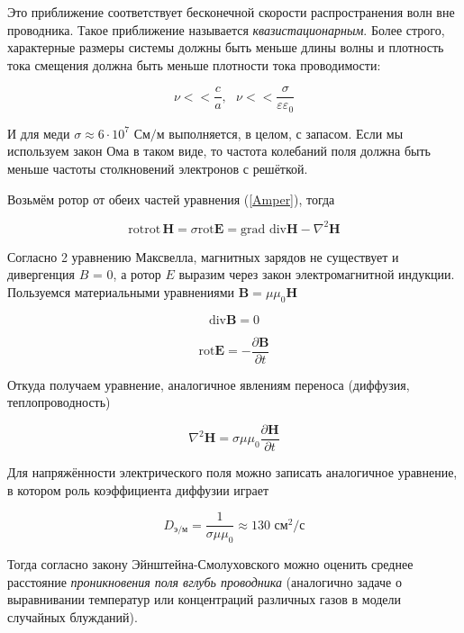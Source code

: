 \documentclass[a4paper, 12pt]{article} %
\begin{document}
Это приближение соответствует бесконечной скорости распространения волн вне проводника. Такое приближение называется \textit{квазистационарным}. Более строго, характерные размеры системы должны быть меньше длины волны и плотность тока смещения должна быть меньше плотности тока проводимости:

\begin{equation}
    \nu << \frac{c}{a}, \text{   } \nu << \frac{\sigma}{\varepsilon \varepsilon_0}
    \label{boundary conditions}
\end{equation}

И для меди $\sigma \approx 6 \cdot 10^7 \text{ См/м}$ выполняется, в целом, с запасом. Если мы используем закон Ома в таком виде, то частота колебаний поля должна быть меньше частоты столкновений электронов с решёткой.

Возьмём ротор от обеих частей уравнения (\ref{Amper}), тогда

\[\text{rot} \text{rot} \, \mathbf{H} = \sigma \text{rot} \mathbf{E} = \text{grad div} \mathbf{H} - \nabla^2 \mathbf{H} \]

Согласно 2 уравнению Максвелла, магнитных зарядов не существует и дивергенция $B$ = 0, а ротор $E$ выразим через закон электромагнитной индукции. Пользуемся материальными уравнениями $\mathbf{B} = \mu \mu_0 \mathbf{H}$

\[ \text{div} \mathbf{B} = 0 \]

\begin{equation}
    \text{rot} \mathbf{E} = - \frac{\partial \mathbf{B}}{\partial t}
    \label{electromagnetic induction}
\end{equation} 

Откуда получаем уравнение, аналогичное явлениям переноса (диффузия, теплопроводность)


\begin{equation}
    \nabla^2 \mathbf{H} = \sigma \mu \mu_0 \frac{\partial \mathbf{H}}{\partial t}
    \label{the diffusion equation}
\end{equation}

Для напряжённости электрического поля можно записать аналогичное уравнение, в котором роль коэффициента диффузии играет

\[D_\text{э/м} = \frac{1}{\sigma \mu \mu_0} \approx 130 \text{ см}^2 / \text{с}\]

Тогда согласно закону Эйнштейна-Смолуховского можно оценить среднее расстояние \textit{проникновения поля вглубь проводника} (аналогично задаче о выравнивании температур или концентраций различных газов в модели случайных блужданий).
\end{document}
